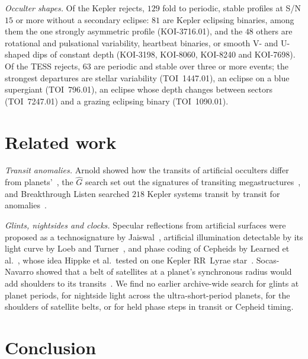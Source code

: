 \documentclass[3p,11pt]{elsarticle}
\begin{document}
\emph{Occulter shapes.} Of the Kepler rejects, $129$ fold to periodic, stable profiles
at S/N $15$ or more without a secondary eclipse: $81$ are Kepler eclipsing binaries,
among them the one strongly asymmetric profile (KOI-3716.01), and the $48$ others are
rotational and pulsational variability, heartbeat binaries, or smooth V- and U-shaped
dips of constant depth (KOI-3198, KOI-8060, KOI-8240 and KOI-7698). Of the TESS rejects,
$63$ are periodic and stable over three or more events; the strongest departures are
stellar variability (TOI~1447.01), an eclipse on a blue supergiant (TOI~796.01), an
eclipse whose depth changes between sectors (TOI~7247.01) and a grazing eclipsing binary
(TOI~1090.01).

\section{Related work}\label{sec:related}

\emph{Transit anomalies.} Arnold showed how the transits of artificial occulters differ
from planets'~\cite{Arnold2005}, the $\hat{G}$ search set out the signatures of
transiting megastructures~\cite{Wright2016}, and Breakthrough Listen searched $218$
Kepler systems transit by transit for anomalies~\cite{Zuckerman2023b}.

\emph{Glints, nightsides and clocks.} Specular reflections from artificial surfaces were
proposed as a technosignature by Jaiswal~\cite{Jaiswal2023}, artificial illumination
detectable by its light curve by Loeb and Turner~\cite{LoebTurner2012}, and phase coding
of Cepheids by Learned et al.~\cite{Learned2012}, whose idea Hippke et al.\ tested on one
Kepler RR~Lyrae star~\cite{Hippke2015}. Socas-Navarro showed that a belt of satellites at
a planet's synchronous radius would add shoulders to its transits~\cite{SocasNavarro2018}.
We find no earlier archive-wide search for glints at planet periods, for nightside light
across the ultra-short-period planets, for the shoulders of satellite belts, or for held
phase steps in transit or Cepheid timing.

\section{Conclusion}\label{sec:conclusion}
\end{document}
